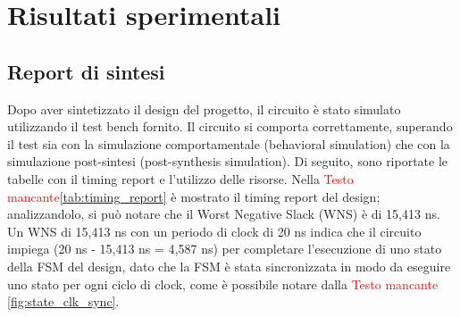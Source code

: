 \documentclass[11pt,a4paper]{article}
\begin{document}
\section{Risultati sperimentali}

\vspace{0.2em}\subsection{Report di sintesi}

\vspace{0.3em}\hspace{1em} Dopo aver sintetizzato il design del progetto, il circuito è stato simulato utilizzando il test bench fornito. Il circuito si comporta correttamente, superando il test sia con la simulazione comportamentale (behavioral simulation) che con la simulazione post-sintesi (post-synthesis simulation). Di seguito, sono riportate le tabelle con il timing report e l'utilizzo delle risorse. Nella \textcolor{red}{Testo mancante}\autoref{tab:timing_report} 
è mostrato il timing report del design; analizzandolo, si può notare che il Worst Negative Slack (WNS) è di 15,413 ns. Un WNS di 15,413 ns con un periodo di clock di 20 ns indica che il circuito impiega (20 ns - 15,413 ns = 4,587 ns) per completare l'esecuzione di uno stato della FSM del design, dato che la FSM è stata sincronizzata in modo da eseguire uno stato per ogni ciclo di clock, come è possibile notare dalla \textcolor{red}{Testo mancante}
\autoref{fig:state_clk_sync}.
\end{document}
